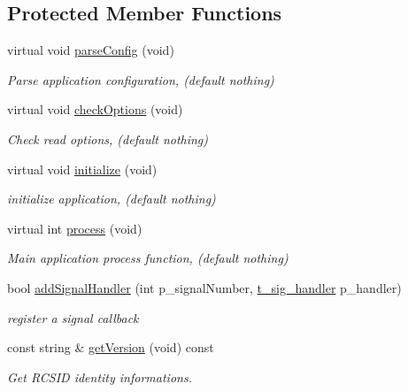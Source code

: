 \subsection*{Protected Member Functions}
\begin{DoxyCompactItemize}
\item 
virtual void \hyperlink{classxtd_1_1Application_a8684d1d061027893f91580106a821d88}{parse\-Config} (void)
\begin{DoxyCompactList}\small\item\em Parse application configuration, (default nothing) \end{DoxyCompactList}\item 
virtual void \hyperlink{classxtd_1_1Application_a3c63f070ac7baaea43a32b3064d0030b}{check\-Options} (void)
\begin{DoxyCompactList}\small\item\em Check read options, (default nothing) \end{DoxyCompactList}\item 
virtual void \hyperlink{classxtd_1_1Application_ab8e835ba678494c42e12c4613958d18a}{initialize} (void)
\begin{DoxyCompactList}\small\item\em initialize application, (default nothing) \end{DoxyCompactList}\item 
virtual int \hyperlink{classxtd_1_1Application_aef6043d47982bc1983a84e2c8a53f0cd}{process} (void)
\begin{DoxyCompactList}\small\item\em Main application process function, (default nothing) \end{DoxyCompactList}\item 
bool \hyperlink{classxtd_1_1Application_afdb5173d0105fcf549ee6f61e6dcbe49}{add\-Signal\-Handler} (int p\-\_\-signal\-Number, \hyperlink{classxtd_1_1Application_a907b6fe8247636495890e668530863d6}{t\-\_\-sig\-\_\-handler} p\-\_\-handler)
\begin{DoxyCompactList}\small\item\em register a signal callback \end{DoxyCompactList}\item 
const string \& \hyperlink{classxtd_1_1Application_ab7be8fa583daa66271562a83817b172c}{get\-Version} (void) const 
\begin{DoxyCompactList}\small\item\em Get R\-C\-S\-I\-D identity informations. \end{DoxyCompactList}\item 

\end{DoxyCompactItemize}

